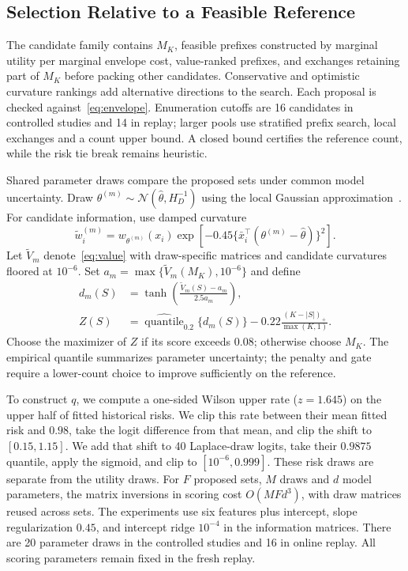 \documentclass[runningheads]{llncs}
\begin{document}
\subsection{Selection Relative to a Feasible Reference}
The candidate family contains $M_K$, feasible prefixes constructed by marginal utility per marginal envelope cost, value-ranked prefixes, and exchanges retaining part of $M_K$ before packing other candidates. Conservative and optimistic curvature rankings add alternative directions to the search. Each proposal is checked against~\eqref{eq:envelope}. Enumeration cutoffs are 16 candidates in controlled studies and 14 in replay; larger pools use stratified prefix search, local exchanges and a count upper bound. A closed bound certifies the reference count, while the risk tie break remains heuristic.

Shared parameter draws compare the proposed sets under common model uncertainty. Draw $\theta^{(m)}\sim\mathcal N(\widehat\theta,H_D^{-1})$ using the local Gaussian approximation~\cite{mackay1992practical}. For candidate information, use damped curvature
\begin{equation}
 \widetilde w_i^{(m)}=w_{\theta^{(m)}}(x_i)
 \exp\!\left[-0.45\{\bar x_i^\top(\theta^{(m)}-\widehat\theta)\}^2\right].
\end{equation}
Let $\widetilde V_m$ denote~\eqref{eq:value} with draw-specific matrices and candidate curvatures floored at $10^{-6}$. Set $a_m=\max\{\widetilde V_m(M_K),10^{-6}\}$ and define
\begin{align}
 d_m(S)&=\tanh\!\left(
 \frac{\widetilde V_m(S)-a_m}{2.5a_m}\right),\\
 Z(S)&=\widehat{\operatorname{quantile}}_{0.2}\{d_m(S)\}
       -0.22\frac{(K-|S|)_+}{\max(K,1)}.\label{eq:score}
\end{align}
Choose the maximizer of $Z$ if its score exceeds $0.08$; otherwise choose $M_K$. The empirical quantile summarizes parameter uncertainty; the penalty and gate require a lower-count choice to improve sufficiently on the reference.

To construct $q$, we compute a one-sided Wilson upper rate ($z=1.645$) on the upper half of fitted historical risks. We clip this rate between their mean fitted risk and $0.98$, take the logit difference from that mean, and clip the shift to $[0.15,1.15]$. We add that shift to 40 Laplace-draw logits, take their $0.9875$ quantile, apply the sigmoid, and clip to $[10^{-6},0.999]$. These risk draws are separate from the utility draws. For $F$ proposed sets, $M$ draws and $d$ model parameters, the matrix inversions in scoring cost $O(MFd^3)$, with draw matrices reused across sets. The experiments use six features plus intercept, slope regularization $0.45$, and intercept ridge $10^{-4}$ in the information matrices. There are 20 parameter draws in the controlled studies and 16 in online replay. All scoring parameters remain fixed in the fresh replay.
\end{document}
